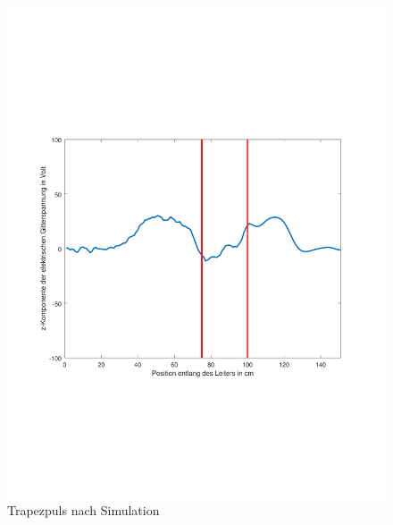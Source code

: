 \documentclass[Protokollheft.tex]{subfiles}
\begin{document}
\begin{figure}[ht]
	\centering
	\includegraphics[trim = 20mm 65mm 20mm 65mm, clip,width=0.7\linewidth]{untitledT3.pdf}
	\caption{Trapezpuls nach Simulation}\label{fig:inh3}
\end{figure} 
\end{document}
